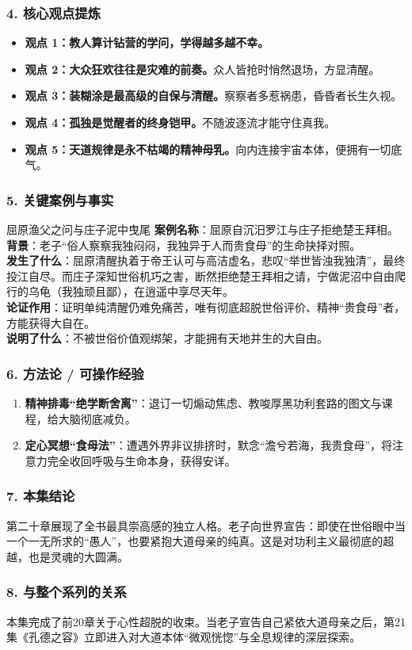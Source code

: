 \subsubsection{4. 核心观点提炼}
\begin{itemize}
    \item \textbf{观点 1：教人算计钻营的学问，学得越多越不幸。}
    \item \textbf{观点 2：大众狂欢往往是灾难的前奏。}众人皆抢时悄然退场，方显清醒。
    \item \textbf{观点 3：装糊涂是最高级的自保与清醒。}察察者多惹祸患，昏昏者长生久视。
    \item \textbf{观点 4：孤独是觉醒者的终身铠甲。}不随波逐流才能守住真我。
    \item \textbf{观点 5：天道规律是永不枯竭的精神母乳。}向内连接宇宙本体，便拥有一切底气。
\end{itemize}

\subsubsection{5. 关键案例与事实}
\begin{CaseBox}{屈原渔父之问与庄子泥中曳尾}
\textbf{案例名称}：屈原自沉汨罗江与庄子拒绝楚王拜相。\\
\textbf{背景}：老子“俗人察察我独闷闷，我独异于人而贵食母”的生命抉择对照。\\
\textbf{发生了什么}：屈原清醒执着于帝王认可与高洁虚名，悲叹“举世皆浊我独清”，最终投江自尽。而庄子深知世俗机巧之害，断然拒绝楚王拜相之请，宁做泥沼中自由爬行的乌龟（我独顽且鄙），在逍遥中享尽天年。\\
\textbf{论证作用}：证明单纯清醒仍难免痛苦，唯有彻底超脱世俗评价、精神“贵食母”者，方能获得大自在。\\
\textbf{说明了什么}：不被世俗价值观绑架，才能拥有天地并生的大自由。
\end{CaseBox}

\subsubsection{6. 方法论 / 可操作经验}
\begin{enumerate}
    \item \textbf{精神排毒“绝学断舍离”}：退订一切煽动焦虑、教唆厚黑功利套路的图文与课程，给大脑彻底减负。
    \item \textbf{定心冥想“食母法”}：遭遇外界非议排挤时，默念“澹兮若海，我贵食母”，将注意力完全收回呼吸与生命本身，获得安详。
\end{enumerate}

\subsubsection{7. 本集结论}
第二十章展现了全书最具崇高感的独立人格。老子向世界宣告：即使在世俗眼中当一个一无所求的“愚人”，也要紧抱大道母亲的纯真。这是对功利主义最彻底的超越，也是灵魂的大圆满。

\subsubsection{8. 与整个系列的关系}
本集完成了前20章关于心性超脱的收束。当老子宣告自己紧依大道母亲之后，第21集《孔德之容》立即进入对大道本体“微观恍惚”与全息规律的深层探索。